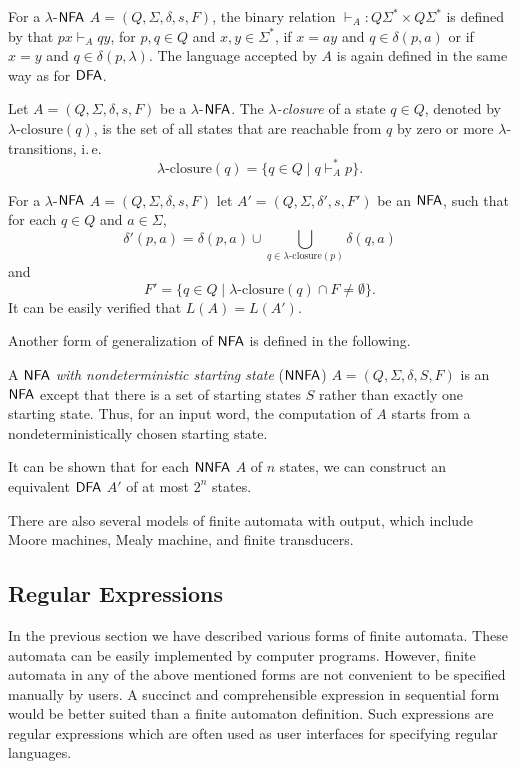 For a \index{$\lambda$-$\NFA$}$\lambda$-$\NFA$ $A = (Q, \Sigma, \delta, s, F)$, the binary relation $\vdash_A: Q \Sigma^* \times Q \Sigma^*$ is defined by that $px \vdash_A qy$, for $p, q \in Q$ and $x, y \in \Sigma^*$, if $x = ay$ and $q \in \delta(p, a)$ or if $x = y$ and $q \in \delta(p, \lambda)$. The language accepted by $A$ is again defined in the same way as for \index{$\DFA$}$\DFA$.

Let $A = (Q, \Sigma, \delta, s, F)$ be a \index{$\lambda$-$\NFA$}$\lambda$-$\NFA$. The \emph{$\lambda$-closure} of a state $q \in Q$, denoted by $\lambda \text{-closure}(q)$, is the set of all states that are reachable from $q$ by zero or more $\lambda$-transitions, i.\,e.\ $$\lambda \text{-closure}(q) = \{q \in Q \mid q \vdash_A^* p \}.$$

For a \index{$\lambda$-$\NFA$}$\lambda$-$\NFA$ $A = (Q, \Sigma, \delta, s, F)$ let $A' = (Q, \Sigma, \delta', s, F')$ be an \index{$\NFA$}$\NFA$, such that for each $q \in Q$ and $a \in \Sigma$, $$\delta'(p, a) = \delta(p, a) \cup \bigcup_{q \in \lambda \text{-closure}(p)}\delta(q, a)$$ and $$F' = \{ q \in Q \mid \lambda\text{-closure}(q) \cap F \neq \emptyset \}.$$ It can be easily verified that $L(A) = L(A')$.

Another form of generalization of \index{$\NFA$}$\NFA$ is defined in the following.

A \emph{$\NFA$ with nondeterministic starting state} \index{$\NNFA$}($\NNFA$) $A = (Q, \Sigma, \delta, S, F)$ is an \index{$\NFA$}$\NFA$ except that there is a set of starting states $S$ rather than exactly one starting state. Thus, for an input word, the computation of $A$ starts from a nondeterministically chosen starting state.

It can be shown that for each $\NNFA$ $A$ of $n$ states, we can construct an equivalent \index{$\DFA$}$\DFA$ $A'$ of at most $2^n$ states.

There are also several models of finite automata with output, which include Moore machines, Mealy machine, and finite transducers.

\subsection{Regular Expressions}
\label{subsection:regular-expressions}

In the previous section we have described various forms of finite automata. These automata can be easily implemented by computer programs. However, finite automata in any of the above mentioned forms are not convenient to be specified manually by users. A succinct and comprehensible expression in sequential form would be better suited than a finite automaton definition. Such expressions are regular expressions which are often used as user interfaces for specifying regular languages.

